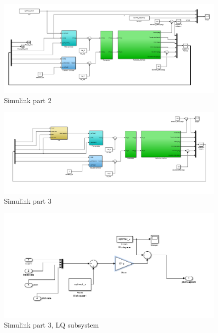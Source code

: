 \documentclass[a4paper, 12pt]{article}\usepackage[utf8]{inputenc}
\begin{document}
\begin{figure}[H]
    \centering
    \includegraphics[width=150mm]{Part2/simulink_part2.PNG}
    \caption{Simulink part 2}
    \label{fig:sim2}
\end{figure}

\begin{figure}[H]
    \centering
    \includegraphics[width=150mm]{Part3/simulink_part3.PNG}
    \caption{Simulink part 3}
    \label{fig:sim3}
\end{figure}

\begin{figure}[H]
    \centering
    \includegraphics[width=150mm]{Part3/simulink_LQsubsystem_part3.PNG}
    \caption{Simulink part 3, LQ subsystem}
    \label{fig:sim3_sub}
\end{figure}
\end{document}
